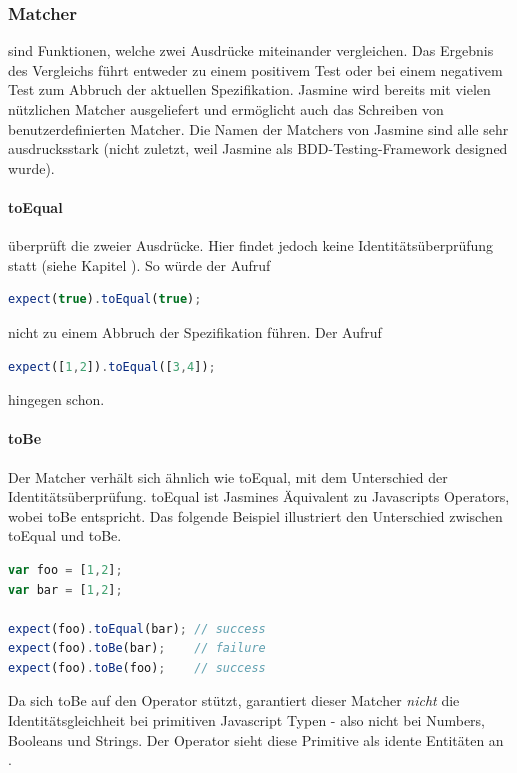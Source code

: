 \subsubsection{Matcher}
 sind Funktionen, welche zwei Ausdrücke miteinander vergleichen. Das Ergebnis des Vergleichs führt entweder zu einem positivem Test oder bei einem negativem Test zum Abbruch der aktuellen Spezifikation. Jasmine wird bereits mit vielen nützlichen Matcher ausgeliefert und ermöglicht auch das Schreiben von benutzerdefinierten Matcher. Die Namen der Matchers von Jasmine sind alle sehr ausdrucksstark (nicht zuletzt, weil Jasmine als BDD-Testing-Framework designed wurde).

\paragraph{toEqual}
 überprüft die  zweier Ausdrücke. Hier findet jedoch keine Identitätsüberprüfung statt (siehe Kapitel ). So würde der Aufruf
\begin{lstlisting}[language=JavaScript]
  expect(true).toEqual(true);
\end{lstlisting}
nicht zu einem Abbruch der Spezifikation führen. Der Aufruf
\begin{lstlisting}[language=JavaScript]
  expect([1,2]).toEqual([3,4]);
\end{lstlisting}
hingegen schon.

\paragraph{toBe}
Der Matcher  verhält sich ähnlich wie toEqual, mit dem Unterschied der Identitätsüberprüfung. toEqual ist Jasmines Äquivalent zu Javascripts \glqq{==\grqq} Operators, wobei toBe \glqq{===\grqq} entspricht. Das folgende Beispiel illustriert den Unterschied zwischen toEqual und toBe.

\begin{lstlisting}[language=JavaScript]
var foo = [1,2];
var bar = [1,2];

expect(foo).toEqual(bar); // success
expect(foo).toBe(bar);    // failure
expect(foo).toBe(foo);    // success
\end{lstlisting}

Da sich toBe auf den \glqq{===\grqq} Operator stützt, garantiert dieser Matcher \textit{nicht} die Identitätsgleichheit bei primitiven Javascript Typen - also nicht bei Numbers, Booleans und Strings. Der \glqq{===\grqq} Operator sieht diese Primitive als idente Entitäten an \autocite[16]{Hahn:2013}.

